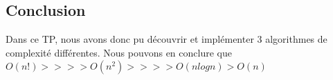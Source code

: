 \documentclass{article}
\begin{document}
\subsection{Conclusion}
Dans ce TP, nous avons donc pu découvrir et implémenter 3 algorithmes de complexité différentes. Nous pouvons en conclure que $O(n!) >>>> O(n^2) >>>> O(nlogn) > O(n)$


\end{document}
